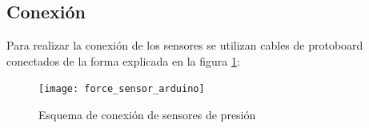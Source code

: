         \subsection{Conexión} %
        \label{sub:Conexion}

            Para realizar la conexión de los sensores se utilizan cables de protoboard conectados de la forma
            explicada en la figura \ref{fig:EsquemaConexion}:

            \begin{figure}[ht]
                \centering
                \texttt{[image: force\_sensor\_arduino]}
                \caption{Esquema de conexión de sensores de presión\cite{force_sensor_arduino}
                         \label{fig:EsquemaConexion}}
            \end{figure}
        


